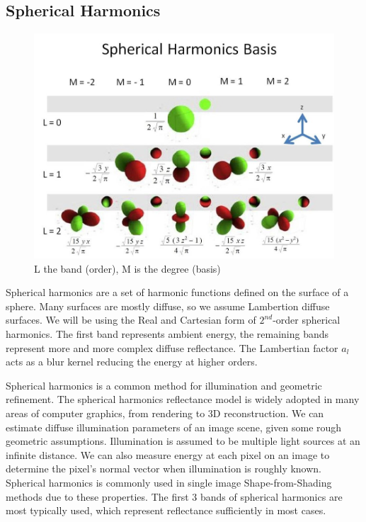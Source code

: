 \documentclass[10pt,twocolumn,letterpaper]{article}
\begin{document}
\subsection{Spherical Harmonics}
\begin{figure}[h]
    \begin{center}
        \includegraphics [scale=0.5] {image/sh_basis.jpg}
    \end{center}
    \caption{L the band (order), M is the degree (basis)}
    \label{fig:sh-basis}
\end{figure} 
Spherical harmonics are a set of harmonic functions defined on the surface of a sphere. Many surfaces are mostly diffuse, so we assume Lambertion diffuse surfaces. We will be using the Real and Cartesian form of $2^{nd}$-order spherical harmonics. The first band represents ambient energy, the remaining bands represent more and more complex diffuse reflectance. The Lambertian factor $a_l$ acts as a blur kernel reducing the energy at higher orders. \par
Spherical harmonics is a common method for illumination and geometric refinement. The spherical harmonics reflectance model is widely adopted in many areas of computer graphics, from rendering to 3D reconstruction. We can estimate diffuse illumination parameters of an image scene, given some rough geometric assumptions. Illumination is assumed to be multiple light sources at an infinite distance. We can also measure energy at each pixel on an image to determine the pixel's normal vector when illumination is roughly known. Spherical harmonics is commonly used in single image Shape-from-Shading methods due to these properties. The first 3 bands of spherical harmonics are most typically used, which represent reflectance sufficiently in most cases.
\end{document}
